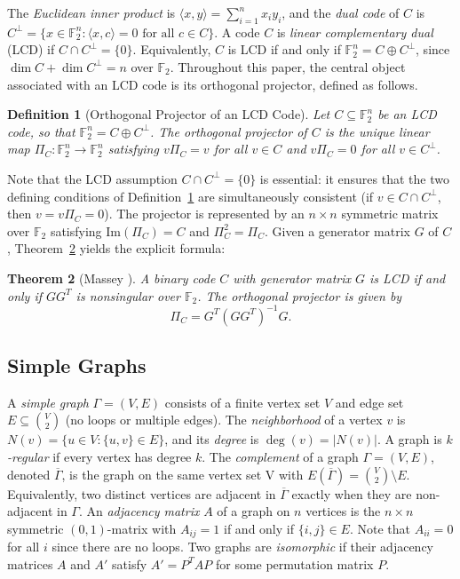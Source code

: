\documentclass[a4paper,11pt]{article}
\newtheorem{theorem}{Theorem}[section]
\newtheorem{definition}[theorem]{Definition}
\theoremstyle{remark}
\newcommand{\FF}{\mathbb{F}}
\begin{document}
The \emph{Euclidean inner product} is $\langle x,y \rangle = \sum_{i=1}^n x_iy_i$, and the \emph{dual code} of $C$ is $C^\perp = \{x \in \FF_2^n : \langle x,c \rangle = 0 \text{ for all } c \in C\}$.
A code $C$ is \emph{linear complementary dual} (LCD) if $C \cap C^\perp = \{0\}$.
Equivalently, $C$ is LCD if and only if $\FF_2^n = C \oplus C^\perp$, since $\dim C + \dim C^\perp = n$ over $\FF_2$.
Throughout this paper, the central object associated with an LCD code is its orthogonal projector, defined as follows.

\begin{definition}[Orthogonal Projector of an LCD Code]\label{def:projector}
Let $C \subseteq \FF_2^n$ be an LCD code, so that $\FF_2^n = C \oplus C^\perp$. The \emph{orthogonal projector} of $C$ is the unique linear map $\Pi_C : \FF_2^n \to \FF_2^n$ satisfying $v\Pi_C = v$ for all $v \in C$ and $v\Pi_C = 0$ for all $v \in C^\perp$.
\end{definition}

Note that the LCD assumption $C \cap C^\perp = \{0\}$ is essential: it ensures that the two defining conditions of Definition~\ref{def:projector} are simultaneously consistent (if $v \in C \cap C^\perp$, then $v = v\Pi_C = 0$). The projector is represented by an $n \times n$ symmetric matrix over $\FF_2$ satisfying $\mathrm{Im}(\Pi_C) = C$ and $\Pi_C^2 = \Pi_C$. Given a generator matrix $G$ of $C$, Theorem~\ref{thm:massey} yields the explicit formula:


\begin{theorem}[Massey \cite{massey1992}]\label{thm:massey}
A binary code $C$ with generator matrix $G$ is LCD if and only if $GG^T$ is nonsingular over $\FF_2$. The orthogonal projector is given by
\[
\Pi_C = G^T(GG^T)^{-1}G.
\]
\end{theorem}


\subsection{Simple Graphs}

A \emph{simple graph} $\Gamma = (V,E)$ consists of a finite vertex set $V$ and edge set $E \subseteq \binom{V}{2}$ (no loops or multiple edges). The \emph{neighborhood} of a vertex $v$ is $N(v) = \{u \in V : \{u,v\} \in E\}$, and its \emph{degree} is $\deg(v) = |N(v)|$. A graph is \emph{$k$-regular} if every vertex has degree $k$.
The \emph{complement} of a graph $\Gamma=(V,E)$, denoted $\overline{\Gamma}$, is the graph on the same vertex set V with
$E(\overline{\Gamma})=\binom{V}{2}\setminus E.$
Equivalently, two distinct vertices are adjacent in $\overline{\Gamma}$ exactly when they are non-adjacent in $\Gamma$.
An \emph{adjacency matrix} $A$ of a graph on $n$ vertices is the $n \times n$ symmetric $(0,1)$-matrix with $A_{ij} = 1$ if and only if $\{i,j\} \in E$. Note that $A_{ii} = 0$ for all $i$ since there are no loops.
Two graphs are \emph{isomorphic} if their adjacency matrices $A$ and $A'$ satisfy $A' = P^TAP$ for some permutation matrix $P$.
\end{document}
